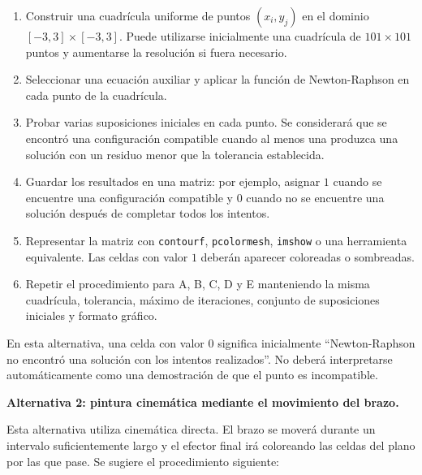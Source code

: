 \documentclass[12pt]{article}
\begin{document}
\begin{enumerate}[label=\arabic*.]
    \item Construir una cuadrícula uniforme de puntos \((x_i,y_j)\) en el dominio \([-3,3]\times[-3,3]\). Puede utilizarse inicialmente una cuadrícula de \(101\times101\) puntos y aumentarse la resolución si fuera necesario.
    \item Seleccionar una ecuación auxiliar y aplicar la función de Newton-Raphson en cada punto de la cuadrícula.
    \item Probar varias suposiciones iniciales en cada punto. Se considerará que se encontró una configuración compatible cuando al menos una produzca una solución con un residuo menor que la tolerancia establecida.
    \item Guardar los resultados en una matriz: por ejemplo, asignar \(1\) cuando se encuentre una configuración compatible y \(0\) cuando no se encuentre una solución después de completar todos los intentos.
    \item Representar la matriz con \texttt{contourf}, \texttt{pcolormesh}, \texttt{imshow} o una herramienta equivalente. Las celdas con valor \(1\) deberán aparecer coloreadas o sombreadas.
    \item Repetir el procedimiento para A, B, C, D y E manteniendo la misma cuadrícula, tolerancia, máximo de iteraciones, conjunto de suposiciones iniciales y formato gráfico.
\end{enumerate}

En esta alternativa, una celda con valor \(0\) significa inicialmente ``Newton-Raphson no encontró una solución con los intentos realizados''. No deberá interpretarse automáticamente como una demostración de que el punto es incompatible.

\textbf{Alternativa 2: pintura cinemática mediante el movimiento del brazo.}

Esta alternativa utiliza cinemática directa. El brazo se moverá durante un intervalo suficientemente largo y el efector final irá coloreando las celdas del plano por las que pase. Se sugiere el procedimiento siguiente:
\end{document}

